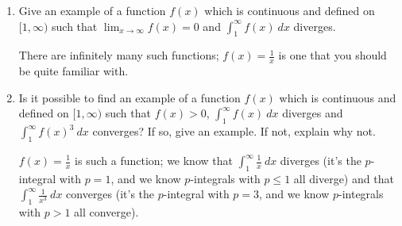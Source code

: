 \documentclass[main]{subfiles}
\begin{document}
\begin{enumerate}
\begin{enumerate}
    \begin{solution}
      There are infinitely many such functions; $f(x) = \displaystyle
      \frac{1}{x^2}$ is one.  (An even simpler one is $f(x) = 0$.)
    \end{solution}

  \item
    \begin{problem}[\vfill]
      Give an example of a function $f(x)$ which is continuous and defined
      on $[1, \infty)$ such that $\displaystyle \lim_{x\to\infty}f(x)=0$
      and $\displaystyle \int_1^\infty f(x)~dx$ diverges.
    \end{problem}

    \begin{solution}
      There are infinitely many such functions; $f(x) = \displaystyle
      \frac{1}{x}$ is one that you should be quite familiar with.
    \end{solution}

  \item
    \begin{problem}[\vfill]
      Is it possible to find an example of a function $f(x)$ which is
      continuous and defined on $[1, \infty)$ such that $f(x)>0$,
      $\displaystyle \int_1^\infty f(x)~dx$ diverges and $\displaystyle
      \int_1^\infty f(x)^3~dx$ converges?  If so, give an example. If not,
      explain why not.
    \end{problem}

    \begin{solution}
      $f(x) = \displaystyle \frac{1}{x}$ is such a function; we know that
      $\displaystyle \int_1^\infty \frac{1}{x}~dx$ diverges (it's the
      $p$-integral with $p = 1$, and we know $p$-integrals with $p \leq 1$
      all diverge) and that $\displaystyle \int_1^\infty \frac{1}{x^3}~dx$
      converges (it's the $p$-integral with $p = 3$, and we know
      $p$-integrals with $p > 1$ all converge).
    \end{solution}

  \end{enumerate}           
\end{enumerate}
\end{document}
